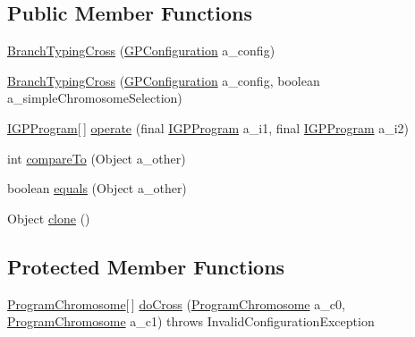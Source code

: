 \subsection*{Public Member Functions}
\begin{DoxyCompactItemize}
\item 
\hyperlink{classorg_1_1jgap_1_1gp_1_1impl_1_1_branch_typing_cross_a3758029d8ce09cc9042edaf0914d21c6}{Branch\-Typing\-Cross} (\hyperlink{classorg_1_1jgap_1_1gp_1_1impl_1_1_g_p_configuration}{G\-P\-Configuration} a\-\_\-config)
\item 
\hyperlink{classorg_1_1jgap_1_1gp_1_1impl_1_1_branch_typing_cross_a103a52b1a81b625eed76163143085938}{Branch\-Typing\-Cross} (\hyperlink{classorg_1_1jgap_1_1gp_1_1impl_1_1_g_p_configuration}{G\-P\-Configuration} a\-\_\-config, boolean a\-\_\-simple\-Chromosome\-Selection)
\item 
\hyperlink{interfaceorg_1_1jgap_1_1gp_1_1_i_g_p_program}{I\-G\-P\-Program}\mbox{[}$\,$\mbox{]} \hyperlink{classorg_1_1jgap_1_1gp_1_1impl_1_1_branch_typing_cross_ac9c1c1bf7edeadd26dccbcdd9d33ffc3}{operate} (final \hyperlink{interfaceorg_1_1jgap_1_1gp_1_1_i_g_p_program}{I\-G\-P\-Program} a\-\_\-i1, final \hyperlink{interfaceorg_1_1jgap_1_1gp_1_1_i_g_p_program}{I\-G\-P\-Program} a\-\_\-i2)
\item 
int \hyperlink{classorg_1_1jgap_1_1gp_1_1impl_1_1_branch_typing_cross_aee82d058776b77a2af99d5fada3612cb}{compare\-To} (Object a\-\_\-other)
\item 
boolean \hyperlink{classorg_1_1jgap_1_1gp_1_1impl_1_1_branch_typing_cross_a0cfbce5588aac6f850bd62cdcf8db52b}{equals} (Object a\-\_\-other)
\item 
Object \hyperlink{classorg_1_1jgap_1_1gp_1_1impl_1_1_branch_typing_cross_a42f7839caf694df2721f85464cf0508d}{clone} ()
\end{DoxyCompactItemize}
\subsection*{Protected Member Functions}
\begin{DoxyCompactItemize}
\item 
\hyperlink{classorg_1_1jgap_1_1gp_1_1impl_1_1_program_chromosome}{Program\-Chromosome}\mbox{[}$\,$\mbox{]} \hyperlink{classorg_1_1jgap_1_1gp_1_1impl_1_1_branch_typing_cross_af4ff7487c5e532031d260dce1b66d74b}{do\-Cross} (\hyperlink{classorg_1_1jgap_1_1gp_1_1impl_1_1_program_chromosome}{Program\-Chromosome} a\-\_\-c0, \hyperlink{classorg_1_1jgap_1_1gp_1_1impl_1_1_program_chromosome}{Program\-Chromosome} a\-\_\-c1)  throws Invalid\-Configuration\-Exception 
\end{DoxyCompactItemize}
